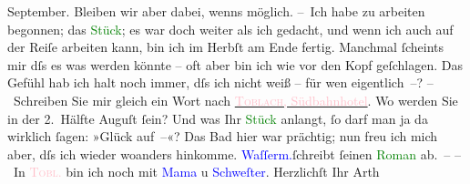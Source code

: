                         September. Bleiben wir aber dabei, wenns möglich.\pend
           \pstart
           – Ich habe zu arbeiten begonnen; das \textcolor{green}{Stück}{}; es war doch weiter als ich gedacht, und wenn
                    ich auch auf der Reiſe arbeiten kann, bin ich im Herbſt am Ende {\pb}fertig. Manchmal ſcheints mir dſs es was werden
                    könnte – oft aber bin ich wie vor den Kopf geſchlagen. Das Gefühl hab ich halt
                    noch immer, dſs ich nicht weiß – für wen eigentlich –?\pend
           \pstart
           – Schreiben Sie mir gleich ein Wort nach \uline{\textcolor{pink}{\textsc{Toblach}, Südbahnhotel}{}\ledrightnote{\textcolor{pink}{Südbahnhotel}}}. Wo werden Sie in der 2. Hälfte Auguſt{ }ſein? Und was Ihr \textcolor{green}{Stück}{} anlangt, ſo darf {\pb}man ja da wirklich ſagen: »Glück auf –«?\pend
           \pstart
           Das Bad hier war prächtig; nun freu ich mich aber, dſs ich wieder woanders
                    hinkomme. \textcolor{blue}{Waſſerm.}{}\ledrightnote{\textcolor{blue}{Jakob Wassermann}}{ }ſchreibt ſeinen \textcolor{green}{Roman}{} ab. –\pend
           \pstart
           – In \textcolor{pink}{\textsc{Tobl}.}{}\ledrightnote{\textcolor{pink}{Toblach}} bin ich noch mit \textcolor{blue}{Mama}{} u \textcolor{blue}{Schweſter}{}.\pend
           \pstart Herzlichſt Ihr \spacefill\mbox{Arth}\pend{}\endnumbering{}  
      